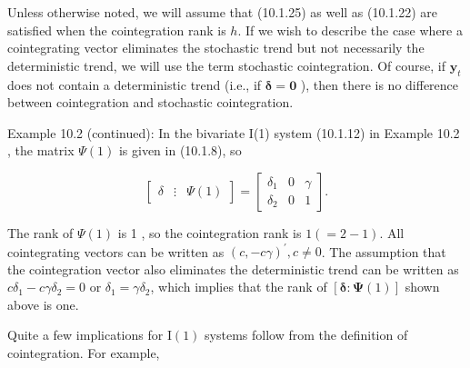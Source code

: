 \documentclass[10pt]{article}
\begin{document}
Unless otherwise noted, we will assume that (10.1.25) as well as (10.1.22) are\\
satisfied when the cointegration rank is $h$. If we wish to describe the case where a cointegrating vector eliminates the stochastic trend but not necessarily the deterministic trend, we will use the term stochastic cointegration. Of course, if $\mathbf{y}_{t}$ does not contain a deterministic trend (i.e., if $\boldsymbol{\delta}=\mathbf{0}$ ), then there is no difference between cointegration and stochastic cointegration.

Example 10.2 (continued): In the bivariate I(1) system (10.1.12) in Example 10.2 , the matrix $\Psi(1)$ is given in (10.1.8), so

$$
\left[\begin{array}{ccc}
\delta & \vdots & \Psi(1)
\end{array}\right]=\left[\begin{array}{ccc}
\delta_{1} & 0 & \gamma \\
\delta_{2} & 0 & 1
\end{array}\right] .
$$

The rank of $\Psi(1)$ is 1 , so the cointegration rank is $1(=2-1)$. All cointegrating vectors can be written as $(c,-c \gamma)^{\prime}, c \neq 0$. The assumption that the cointegration vector also eliminates the deterministic trend can be written as $c \delta_{1}-c \gamma \delta_{2}=0$ or $\delta_{1}=\gamma \delta_{2}$, which implies that the rank of $[\boldsymbol{\delta}: \boldsymbol{\Psi}(1)]$ shown above is one.

Quite a few implications for $\mathrm{I}(1)$ systems follow from the definition of cointegration. For example,
\end{document}
